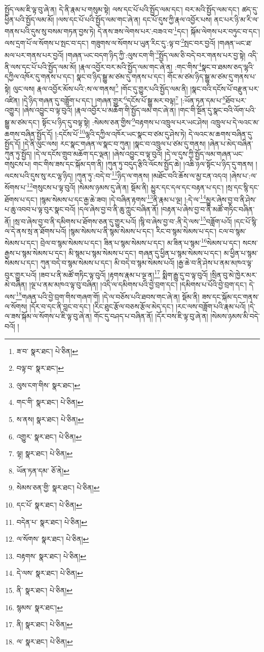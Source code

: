སྤྱོད་ལམ་ཇི་ལྟ་བུ་ཞེ་ན། དེ་ནི་རྣམ་པ་གསུམ་སྟེ། ལས་དང་པོ་པའི་སྤྱོད་ལམ་དང་། བར་མའི་སྤྱོད་ལམ་དང་། ཚད་དུ་ཕྱིན་པའི་སྤྱོད་ལམ་མོ། །ལས་དང་པོ་པའི་སྤྱོད་ལམ་གང་ཞེ་ན། དང་པོ་དུས་ཀྱི་རྣལ་འབྱོར་པས། ནང་པར་ཉི་མ་རི་ལ་གནས་པའི་དུས་སུ་བསམ་གཏན་བྱས་ཏེ། དེ་ནས་ཟས་ལེགས་པར་:བཟའ་བ་\footnote{ཟ་བ་  སྣར་ཐང་།  པེ་ཅིན། }དང་། སྐོམ་ལེགས་པར་བཏུང་བ་དང་། ལས་དྲག་པོ་ལ་སོགས་པ་སྤང་བ་དང་། གཟུགས་ལ་སོགས་པ་ཡུན་རིང་དུ་:ལྟ་བ་\footnote{བལྟ་བ་  སྣར་ཐང་། }སྤང་བར་བྱའོ། །གཞན་ཡང་ཐ་མལ་པར་གནས་པར་བྱའོ། །གཞན་ཡང་བདག་ཉིད་ཀྱི་:ལུས་ངག་གི་\footnote{ལུས་ངག་གིས་  སྣར་ཐང་། }སྤྱོད་ལམ་ཅི་བདེ་བར་གནས་པར་བྱ་སྟེ། འདི་ནི་ལས་དང་པོ་པའི་སྤྱོད་ལམ་མོ། །རྣལ་འབྱོར་བར་མའི་སྤྱོད་ལམ་གང་ཞེ་ན། :གང་གིས་\footnote{གང་གི་  སྣར་ཐང་།  པེ་ཅིན། }སྣང་བ་ཐམས་ཅད་ལྷའི་དཀྱིལ་འཁོར་དུ་གནས་པ་དང་། སྣང་བ་ཉིད་སྒྱུ་མ་ཙམ་དུ་གནས་པ་དང་། གོང་མ་ཙམ་ཉིད་སྒྱུ་མ་ཙམ་དུ་གནས་པ་སྟེ། ལུང་ལས། རྣལ་འབྱོར་མོས་པའི་:ས་ལ་གནས།\footnote{ས་ནས།  སྣར་ཐང་།  པེ་ཅིན། } །གོང་དུ་གྱུར་པའི་སྤྱོད་ལམ་ནི། །སྣང་བའི་དངོས་པོ་བརྫུན་པར་འཛིན། །དེ་ཉིད་གཞན་དུ་བཟློག་པ་དང་། །གཞན་གྱུར་\footnote{འགྱུར་  སྣར་ཐང་།  པེ་ཅིན། }དངོས་པོ་སྒྱུ་མར་བལྟ།\footnote{ལྟ།  སྣར་ཐང་།  པེ་ཅིན། } །:ཡོན་ཏན་དམ་པ་\footnote{ཡོན་ཏན་དམ་  ཅོ་ནེ། }ཐོབ་པར་འགྱུར། །ཞེས་འབྱུང་བ་ལྟ་བུའོ། །རྣལ་འབྱོར་པ་མཆོག་གི་སྤྱོད་ལམ་གང་ཞེ་ན། །གང་གི་སྔོན་དུ་སྣང་བའི་ལོག་པའི་སྒྱུ་མ་ཙམ་དང་། སྟོང་པ་ཉིད་དུ་བལྟ་སྟེ། :སེམས་ཅན་གྱིས་\footnote{སེམས་ཅན་གྱི་  སྣར་ཐང་།  པེ་ཅིན། }བརྟགས་པ་འཁྲུལ་པར་ཡང་ཤེས། འཁྲུལ་པ་དེ་ལའང་མ་ཆགས་བཞིན་སྤྱོད་དོ། །:དངོས་པོ་\footnote{དང་པོ་  སྣར་ཐང་།  པེ་ཅིན། }ལྷའི་དཀྱིལ་འཁོར་ཡང་སྣང་བ་ཙམ་དུ་ཤེས་ཏེ། དེ་ལའང་མ་ཆགས་བཞིན་དུ་སྤྱོད་དོ། །དེ་ནི་ལུང་ལས། རང་སྣང་གཞན་ལ་སྣང་བ་ཀུན། །སྣང་བ་འཁྲུལ་པ་ཙམ་དུ་གནས། །ཞེན་པ་མེད་བཞིན་ཀུན་ཏུ་སྤྱོད། །དེ་ལ་དངོས་གྲུབ་མཆོག་དང་ལྡན། །ཞེས་འབྱུང་བ་ལྟ་བུའོ། །དེ་ལ་དུས་ཀྱི་སྤྱོད་ལམ་གཞན་ཡང་གསུངས་པ། གང་གིས་ཟས་དང་སྐོམ་དག་ནི། །ཀུན་ཏུ་བདུད་རྩིའི་ལོངས་སྤྱོད་ཆེ། །འཆི་ཉལ་སྟོང་པ་ཉིད་དུ་གནས། །ལངས་པའི་དུས་སུ་རང་ལྷ་ཉིད། །ཀུན་ཏུ་:བདེ་བ་\footnote{བདེན་པ་  སྣར་ཐང་།  པེ་ཅིན། }ཉིད་ལ་གནས། །མཐོང་བའི་ཆོས་ལ་མྱ་ངན་འདའ། །ཞེས་པ་:ལ་སོགས་པ་\footnote{ལ་སོགས་  སྣར་ཐང་།  པེ་ཅིན། }གསུངས་པ་ལྟ་བུའོ། །སེམས་ཉམས་དུ་ཞེ་ན། སྡོམ་ནི། མྱུར་དང་དལ་དང་བརྟན་པ་དང་། །སྲ་དང་སྙི་དང་ཐོགས་པ་དང་། །སྙམ་སེམས་པ་དང་རྒྱ་ཆེ་ཟབ། །དེ་བཞིན་རྟགས་\footnote{བརྟགས་  སྣར་ཐང་།  པེ་ཅིན། }ནི་རྣམ་པ་ལྔ། །:དེ་ལ་\footnote{དེ་ལས་  སྣར་ཐང་།  པེ་ཅིན། }མྱུར་ཞེས་བྱ་བ་ནི་ཤེས་པ་ཆུ་འབབ་པ་ལྟ་བུར་སྣང་བའོ། །དལ་ཞེས་བྱ་བ་ནི་ཆུ་ཀླུང་བཞིན་ནོ། །བརྟན་པ་ཞེས་བྱ་བ་ནི་མཚོ་གཏིང་བཞིན་ནོ། །སྲ་བ་ཞེས་བྱ་བ་ནི་དམིགས་པ་ཐོགས་ཅན་དུ་གྱུར་པའོ། །སྙི་བ་ཞེས་བྱ་བ་:ནི་དེ་ལས་\footnote{ནི་  སྣར་ཐང་།  པེ་ཅིན། }བཟློག་པའོ། །དང་པོ་སྙི་ལ་དེ་ནས་སྲ་ན་ཐོགས་པའོ། །སྙམ་སེམས་པ་ནི་སྙམ་སེམས་པ་དང་། རིང་བ་སྙམ་སེམས་པ་དང་། ངལ་བ་སྙམ་སེམས་པ་དང་། བྲེལ་བ་སྙམ་སེམས་པ་དང་། ཟིན་པ་སྙམ་སེམས་པ་དང་། མ་ཟིན་པ་སྙམ་\footnote{སྙམས་  སྣར་ཐང་། }སེམས་པ་དང་། སངས་རྒྱས་པ་སྙམ་སེམས་པ་དང་། མི་སྙམ་པ་སྙམ་སེམས་པ་དང་། གཞན་དུ་ཕྱིན་པ་སྙམ་སེམས་པ་དང་། མ་ཕྱིན་པ་སྙམ་སེམས་པ་དང་། ཀུན་བདེ་བ་སྙམ་སེམས་པ་དང་། མི་བདེ་བ་སྙམ་སེམས་པའོ། །རྒྱ་ཆེ་བ་ནི་ཤེས་པ་ནམ་མཁའ་ལྟ་བུར་གྱུར་པའོ། །ཟབ་པ་ནི་མཚོ་གཏིང་ལྟ་བུའོ། །རྟགས་རྣམ་པ་ལྔ་ན།\footnote{ནི།  སྣར་ཐང་།  པེ་ཅིན། } སྨིག་རྒྱུ་དུ་བ་ལྟ་བུའོ། །སྲིན་བུ་མེ་ཁྱེར་མར་མེ་བཞིན། །ལྔ་པ་ནམ་མཁའ་ལྟ་བུ་བཞིན། །འདི་ལ་དམིགས་པའི་བྱེ་བྲག་དང་། །དམིགས་པ་པོའི་བྱེ་བྲག་དང་། དེ་ལས་\footnote{ལ་  སྣར་ཐང་།  པེ་ཅིན། }གཞན་པའི་བྱེ་བྲག་གིས་གཞག་གོ། །དེ་ལ་བཅོས་པའི་ཐབས་གང་ཞེ་ན། སྡོམ་ནི། ཟས་དང་སྐོམ་དང་གནས་ལ་སོགས། །དོར་བ་དང་ནི་བླང་བ་དང་། །རིང་ཐུང་རྩོལ་བཅས་རྩོལ་མེད་དང་། །རང་ལས་བཟློག་པའི་རྣམ་པའོ། །དེ་ལ་ཟས་སྐོམ་ལ་སོགས་པ་ཇི་ལྟ་བུ་ཞེ་ན། གོང་དུ་བཤད་པ་བཞིན་ནོ། །དོར་བས་ཇི་ལྟ་བུ་ཞེ་ན། །སེམས་ཉམས་མི་བདེ་བའོ། །
